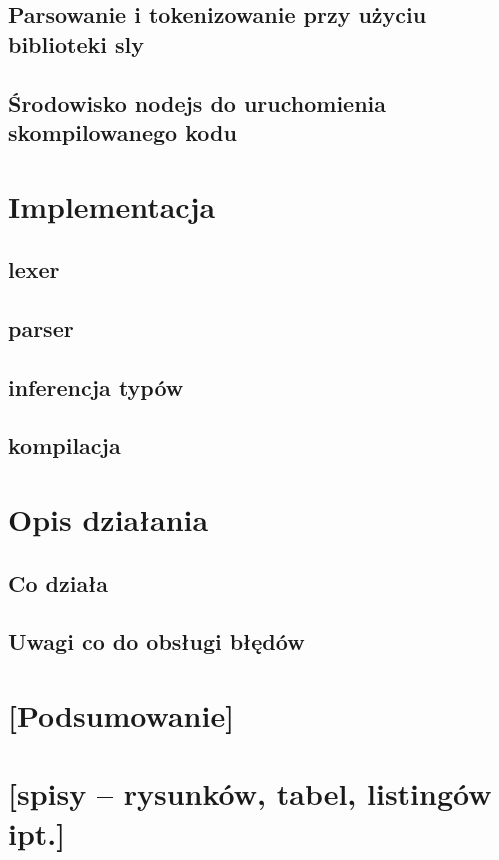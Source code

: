 \documentclass{article}
\begin{document}
\subsection{Parsowanie i tokenizowanie przy użyciu biblioteki sly}
\subsection{Środowisko nodejs do uruchomienia skompilowanego kodu}
\section{Implementacja}
\subsection{lexer}
\subsection{parser}
\subsection{inferencja typów}
\subsection{kompilacja}
\section{Opis działania}
\subsection{Co działa}
\subsection{Uwagi co do obsługi błędów}
\section{[Podsumowanie]}
\section{[spisy -- rysunków, tabel, listingów ipt.]}


\end{document}

